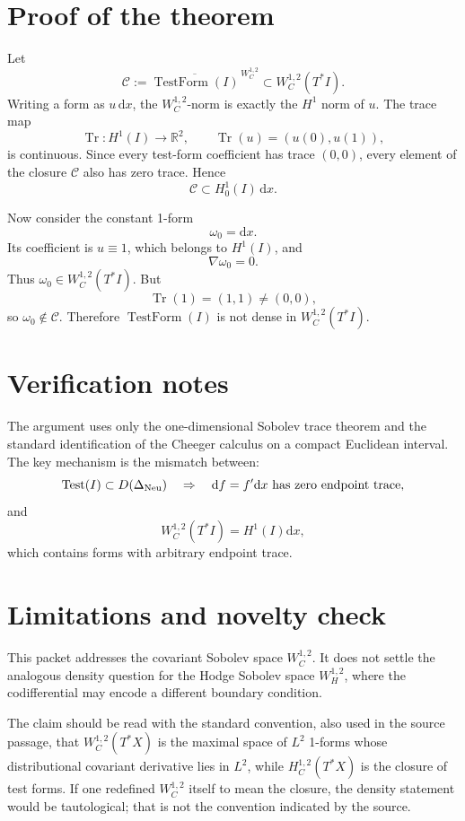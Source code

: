 \documentclass[11pt]{article}
\newcommand{\R}{\mathbb R}
\newcommand{\dd}{\mathrm d}
\newcommand{\dx}{\mathrm dx}
\newcommand{\Test}{\operatorname{Test}}
\newcommand{\TestForm}{\operatorname{TestForm}}
\newcommand{\Tr}{\operatorname{Tr}}
\begin{document}
\section*{Proof of the theorem}

Let
\[
  \mathcal C
  :=
  \overline{\TestForm(I)}^{\,W_C^{1,2}}
  \subset W_C^{1,2}(T^*I).
\]
Writing a form as \(u\,\dx\), the \(W_C^{1,2}\)-norm is exactly the \(H^1\)
norm of \(u\). The trace map
\[
  \Tr:H^1(I)\longrightarrow \R^2,
  \qquad
  \Tr(u)=(u(0),u(1)),
\]
is continuous. Since every test-form coefficient has trace \((0,0)\), every
element of the closure \(\mathcal C\) also has zero trace. Hence
\[
  \mathcal C\subset H_0^1(I)\,\dx.
\]

Now consider the constant 1-form
\[
  \omega_0=\dx.
\]
Its coefficient is \(u\equiv 1\), which belongs to \(H^1(I)\), and
\[
  \nabla\omega_0=0.
\]
Thus \(\omega_0\in W_C^{1,2}(T^*I)\). But
\[
  \Tr(1)=(1,1)\ne(0,0),
\]
so \(\omega_0\notin \mathcal C\). Therefore \(\TestForm(I)\) is not dense in
\(W_C^{1,2}(T^*I)\).

\section*{Verification notes}

The argument uses only the one-dimensional Sobolev trace theorem and the
standard identification of the Cheeger calculus on a compact Euclidean
interval. The key mechanism is the mismatch between:
\[
  \Test(I)\subset D(\Delta_{\mathrm{Neu}})
  \quad\Rightarrow\quad
  \dd f=f'\dx\hbox{ has zero endpoint trace},
\]
and
\[
  W_C^{1,2}(T^*I)=H^1(I)\dx,
\]
which contains forms with arbitrary endpoint trace.

\section*{Limitations and novelty check}

This packet addresses the covariant Sobolev space \(W_C^{1,2}\). It does not
settle the analogous density question for the Hodge Sobolev space
\(W_H^{1,2}\), where the codifferential may encode a different boundary
condition.

The claim should be read with the standard convention, also used in the source
passage, that \(W_C^{1,2}(T^*X)\) is the maximal space of \(L^2\) 1-forms whose
distributional covariant derivative lies in \(L^2\), while
\(H_C^{1,2}(T^*X)\) is the closure of test forms. If one redefined
\(W_C^{1,2}\) itself to mean the closure, the density statement would be
tautological; that is not the convention indicated by the source.
\end{document}
